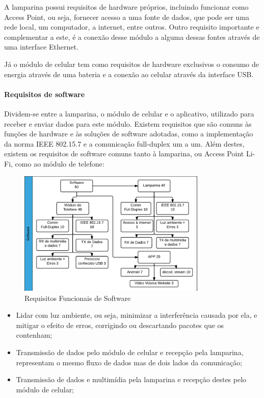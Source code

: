 	A lamparina possui requisitos de hardware próprios, incluindo funcionar como Access Point, ou seja, fornecer acesso a uma fonte de dados, que pode ser uma rede local, um computador, a internet, entre outros. Outro requisito importante e complementar a este, é a conexão desse módulo a alguma dessas fontes através de uma interface Ethernet.
	
	Já o módulo de celular tem como requisitos de hardware exclusivos o consumo de energia através de uma bateria e a conexão ao celular através da interface USB.	
	
	\paragraph{Requisitos de software} 
	Dividem-se entre a lamparina, o módulo de celular e o aplicativo, utilizado para receber e enviar dados para este módulo. Existem requisitos que são comuns às funções de hardware e às soluções de software adotadas, como a implementação da norma IEEE 802.15.7 e a comunicação full-duplex um a um. Além destes, existem os requisitos de software comuns tanto à lamparina, ou Access Point Li-Fi, como ao módulo de telefone:
	
	\begin{figure}[h!]
		\caption{\label{fig_req1_2} Requisitos Funcionais de Software}
		\centering
		\includegraphics[width=0.8\textwidth]{ReqTree1_2.pdf}
	\end{figure}
	
	\begin{itemize}  
		\item Lidar com luz ambiente, ou seja, minimizar a interferência causada por ela, e mitigar o efeito de erros, corrigindo ou descartando pacotes que os contenham;
		\item Transmissão de dados pelo módulo de celular e recepção pela lamparina, representam o mesmo fluxo de dados mas de dois lados da comunicação;
		\item Transmissão de dados e multimídia pela lamparina e recepção destes pelo módulo de celular;
	\end{itemize}
	
